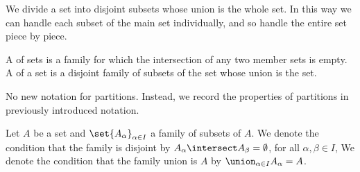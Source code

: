 
\sbasic



\sstart



We divide a set into
disjoint subsets whose
union is the whole set.
In this way we can handle
each subset of the main set
individually, and so handle
the entire set piece by piece.


A 
of sets is a family for which
the intersection of any two
member sets is empty.
A  of
a set is a disjoint family of
subsets of the set
whose union is the set.


No new notation for partitions.
Instead,
we record the properties
of partitions in previously
introduced notation.

Let $A$ be a set and
$\set{A_{\alpha}}_{\alpha \in I}$
a family of subsets of $A$.
We denote the condition that
the family is disjoint by
$A_{\alpha} \intersect A_{\beta} = \emptyset$,
for all $\alpha,\beta \in I$,
We denote the condition that the family
union is $A$ by
$\union_{\alpha \in I} A_{\alpha} = A$.

\strats
